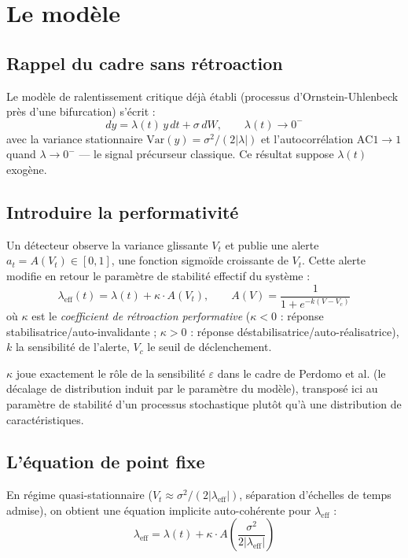 \documentclass[11pt,a4paper]{article}
\begin{document}
\section{Le modèle}

\subsection{Rappel du cadre sans rétroaction}

Le modèle de ralentissement critique déjà établi (processus
d'Ornstein-Uhlenbeck près d'une bifurcation) s'écrit :
$$dy = \lambda(t)\,y\,dt + \sigma\,dW, \qquad \lambda(t) \to 0^-$$
avec la variance stationnaire $\text{Var}(y) = \sigma^2/(2|\lambda|)$ et
l'autocorrélation $\text{AC1} \to 1$ quand $\lambda\to0^-$ — le signal
précurseur classique. Ce résultat suppose $\lambda(t)$ exogène.

\subsection{Introduire la performativité}

\begin{postulat}
Un détecteur observe la variance glissante $V_t$ et publie une alerte
$a_t = A(V_t) \in [0,1]$, une fonction sigmoïde croissante de $V_t$.
Cette alerte modifie en retour le paramètre de stabilité effectif du
système :
$$\lambda_{\text{eff}}(t) = \lambda(t) + \kappa \cdot A(V_t), \qquad A(V) = \frac{1}{1+e^{-k(V-V_c)}}$$
où $\kappa$ est le \emph{coefficient de rétroaction performative}
($\kappa<0$ : réponse stabilisatrice/auto-invalidante ; $\kappa>0$ :
réponse déstabilisatrice/auto-réalisatrice), $k$ la sensibilité de
l'alerte, $V_c$ le seuil de déclenchement.
\end{postulat}

\begin{remarque}
$\kappa$ joue exactement le rôle de la sensibilité $\varepsilon$ dans le
cadre de Perdomo et al. (le décalage de distribution induit par le
paramètre du modèle), transposé ici au paramètre de stabilité d'un
processus stochastique plutôt qu'à une distribution de caractéristiques.
\end{remarque}

\subsection{L'équation de point fixe}

En régime quasi-stationnaire ($V_t \approx \sigma^2/(2|\lambda_{\text{eff}}|)$,
séparation d'échelles de temps admise), on obtient une équation implicite
auto-cohérente pour $\lambda_{\text{eff}}$ :
$$\lambda_{\text{eff}} = \lambda(t) + \kappa \cdot A\!\left(\frac{\sigma^2}{2|\lambda_{\text{eff}}|}\right)$$
\end{document}
